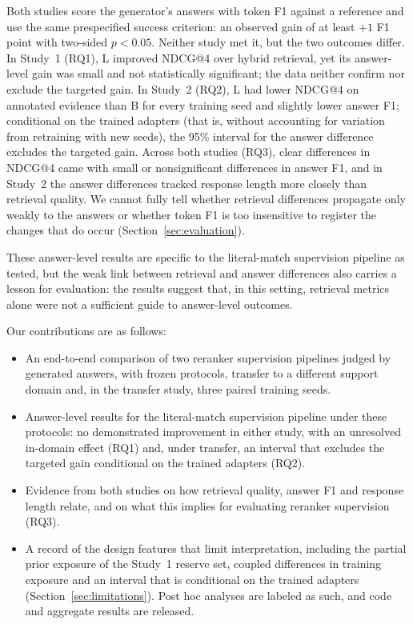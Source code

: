 Both studies score the generator's answers with token F1 against a reference and use the same prespecified success criterion: an observed gain of at least $+1$ F1 point with two-sided $p<0.05$. Neither study met it, but the two outcomes differ. In Study~1 (RQ1), L improved NDCG@4 over hybrid retrieval, yet its answer-level gain was small and not statistically significant; the data neither confirm nor exclude the targeted gain. In Study~2 (RQ2), L had lower NDCG@4 on annotated evidence than B for every training seed and slightly lower answer F1; conditional on the trained adapters (that is, without accounting for variation from retraining with new seeds), the 95\% interval for the answer difference excludes the targeted gain. Across both studies (RQ3), clear differences in NDCG@4 came with small or nonsignificant differences in answer F1, and in Study~2 the answer differences tracked response length more closely than retrieval quality. We cannot fully tell whether retrieval differences propagate only weakly to the answers or whether token F1 is too insensitive to register the changes that do occur (Section~\ref{sec:evaluation}).

These answer-level results are specific to the literal-match supervision pipeline as tested, but the weak link between retrieval and answer differences also carries a lesson for evaluation: the results suggest that, in this setting, retrieval metrics alone were not a sufficient guide to answer-level outcomes.

Our contributions are as follows:
\begin{itemize}[leftmargin=*]
\item An end-to-end comparison of two reranker supervision pipelines judged by generated answers, with frozen protocols, transfer to a different support domain and, in the transfer study, three paired training seeds.
\item Answer-level results for the literal-match supervision pipeline under these protocols: no demonstrated improvement in either study, with an unresolved in-domain effect (RQ1) and, under transfer, an interval that excludes the targeted gain conditional on the trained adapters (RQ2).
\item Evidence from both studies on how retrieval quality, answer F1 and response length relate, and on what this implies for evaluating reranker supervision (RQ3).
\item A record of the design features that limit interpretation, including the partial prior exposure of the Study~1 reserve set, coupled differences in training exposure and an interval that is conditional on the trained adapters (Section~\ref{sec:limitations}). Post hoc analyses are labeled as such, and code and aggregate results are released.
\end{itemize}

